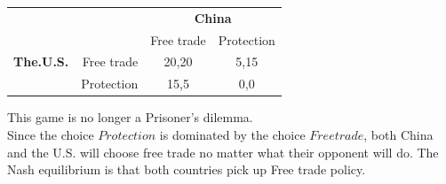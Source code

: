 \documentclass{article}
\begin{document}
\begin{description}
\begin{center}
\begin{tabular}{rrcc}
           &            & \multicolumn{ 2}{c}{{\bf China}} \\

           &            & Free trade & Protection \\

\multicolumn{ 1}{c}{{\bf The.U.S.}} & Free trade &      20,20 &       5,15 \\

\multicolumn{ 1}{c}{{\bf }} & Protection &       15,5 &        0,0 \\

\end{tabular}

    \end{center}
    This game is no longer a Prisoner's dilemma.\\
    Since the choice $Protection$ is dominated by the choice $Free trade$, both China and the U.S. will choose free trade no matter what their opponent will do. The Nash equilibrium is that both countries pick up Free trade policy.
\end{description}
\end{document}
